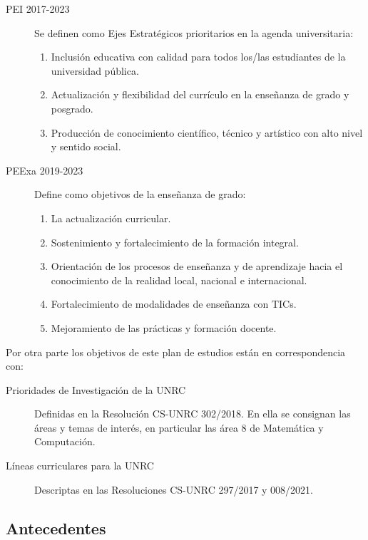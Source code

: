 \documentclass[a4paper, 12pt]{article}
\begin{document}
\begin{description}
\begin{enumerate}
\end{enumerate}

\item[PEI 2017-2023] Se definen como Ejes Estratégicos prioritarios en la agenda universitaria:
\begin{enumerate}
 \item Inclusión    educativa    con    calidad    para         todos  los/las  estudiantes  de  la  universidad  pública.
 
 \item  Actualización  y  flexibilidad  del  currículo  en la enseñanza de grado y posgrado.
 
 \item Producción  de  conocimiento  científico,  técnico y artístico con alto nivel y sentido social. 
\end{enumerate}

\item[PEExa 2019-2023] Define como objetivos de la enseñanza de grado:
\begin{enumerate}
 \item  La actualización curricular.
 \item Sostenimiento y fortalecimiento de la formación integral.
\item Orientación de los procesos de enseñanza y de aprendizaje hacia el
conocimiento de la realidad local, nacional e internacional.
\item Fortalecimiento de modalidades de enseñanza con TICs.
\item Mejoramiento de las prácticas y formación docente.

\end{enumerate}

\end{description}

Por otra parte los objetivos de este plan de estudios están en correspondencia con:

\begin{description}
\item[Prioridades de Investigación de la UNRC] Definidas en la Resolución CS-UNRC 302/2018. 
En ella se consignan las áreas y temas de interés, en particular las área 8 de Matemática y Computación.
\item[Líneas curriculares para la UNRC] Descriptas en las Resoluciones CS-UNRC 297/2017 y 008/2021.
\end{description}




\subsection{Antecedentes}
\end{document}
